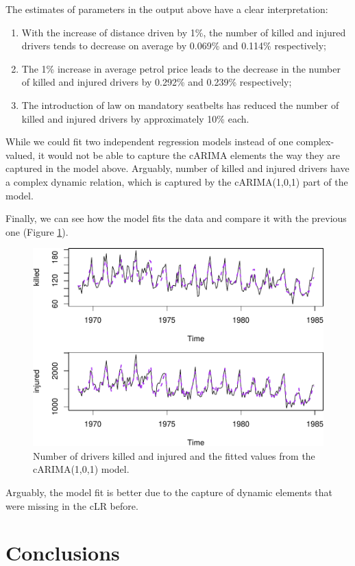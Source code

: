 \documentclass[
]{book}
\providecommand{\tightlist}{%
  \setlength{\itemsep}{0pt}\setlength{\parskip}{0pt}}
\begin{document}
The estimates of parameters in the output above have a clear interpretation:

\begin{enumerate}
\def\labelenumi{\arabic{enumi}.}
\tightlist
\item
  With the increase of distance driven by 1\%, the number of killed and injured drivers tends to decrease on average by 0.069\% and 0.114\% respectively;
\item
  The 1\% increase in average petrol price leads to the decrease in the number of killed and injured drivers by 0.292\% and 0.239\% respectively;
\item
  The introduction of law on mandatory seatbelts has reduced the number of killed and injured drivers by approximately 10\% each.
\end{enumerate}

While we could fit two independent regression models instead of one complex-valued, it would not be able to capture the cARIMA elements the way they are captured in the model above. Arguably, number of killed and injured drivers have a complex dynamic relation, which is captured by the cARIMA(1,0,1) part of the model.

Finally, we can see how the model fits the data and compare it with the previous one (Figure \ref{fig:seatbeltsDataModelFinal}).

\begin{figure}
\centering
\includegraphics{Svetunkov---Svetunkov---Complex-Valued-Econometrics_files/figure-latex/seatbeltsDataModelFinal-1.pdf}
\caption{\label{fig:seatbeltsDataModelFinal}Number of drivers killed and injured and the fitted values from the cARIMA(1,0,1) model.}
\end{figure}

Arguably, the model fit is better due to the capture of dynamic elements that were missing in the cLR before.

\hypertarget{Conclusions}{%
\chapter{Conclusions}\label{Conclusions}}

  
\end{document}
